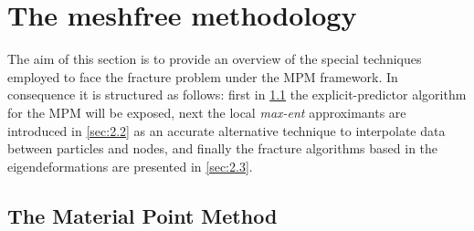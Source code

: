 \message{ !name(2020_EFM_MPM_Eigensoftening.tex)}\documentclass[preprint,12pt,a4paper]{elsarticle}
\begin{document}
\section{The meshfree methodology}
\label{sec:2}

The aim of this section is to provide an overview of the special
techniques employed to face the fracture problem under the MPM
framework. In consequence it is structured as follows: first in
\ref{sec:2.1} the explicit-predictor algorithm for the
MPM will be exposed, next the local \textit{max-ent} approximants are introduced in
\ref{sec:2.2} as an accurate alternative technique to interpolate data
between particles and nodes, and finally the fracture algorithms based
in the eigendeformations are presented in \ref{sec:2.3}.

\subsection{The Material Point Method}
\label{sec:2.1}
\end{document}
